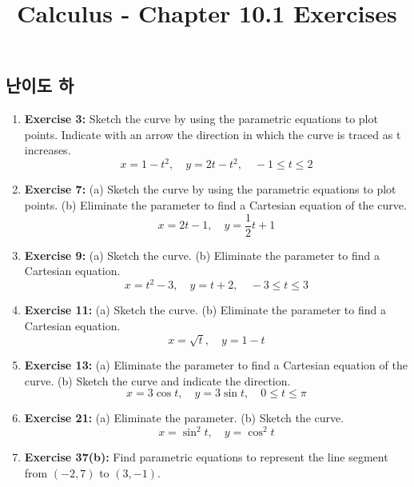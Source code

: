 \documentclass[12pt, a4paper]{article}
\title{Calculus - Chapter 10.1 Exercises}
\author{}
\date{}
\begin{document}
\maketitle
\hrulefill
\vspace{1em}

\subsection*{난이도 하}
\begin{enumerate}
    \item \textbf{Exercise 3:} Sketch the curve by using the parametric equations to plot points. Indicate with an arrow the direction in which the curve is traced as t increases.
    \[ x = 1 - t^2, \quad y = 2t - t^2, \quad -1 \le t \le 2 \]

    \item \textbf{Exercise 7:} (a) Sketch the curve by using the parametric equations to plot points. (b) Eliminate the parameter to find a Cartesian equation of the curve.
    \[ x = 2t - 1, \quad y = \frac{1}{2}t + 1 \]

    \item \textbf{Exercise 9:} (a) Sketch the curve. (b) Eliminate the parameter to find a Cartesian equation.
    \[ x = t^2 - 3, \quad y = t + 2, \quad -3 \le t \le 3 \]

    \item \textbf{Exercise 11:} (a) Sketch the curve. (b) Eliminate the parameter to find a Cartesian equation.
    \[ x = \sqrt{t}, \quad y = 1 - t \]

    \item \textbf{Exercise 13:} (a) Eliminate the parameter to find a Cartesian equation of the curve. (b) Sketch the curve and indicate the direction.
    \[ x = 3\cos t, \quad y = 3\sin t, \quad 0 \le t \le \pi \]

    \item \textbf{Exercise 21:} (a) Eliminate the parameter. (b) Sketch the curve.
    \[ x = \sin^2 t, \quad y = \cos^2 t \]
    
    \item \textbf{Exercise 37(b):} Find parametric equations to represent the line segment from $(-2, 7)$ to $(3, -1)$.
\end{enumerate}

\hrulefill
\vspace{1em}
\end{document}
